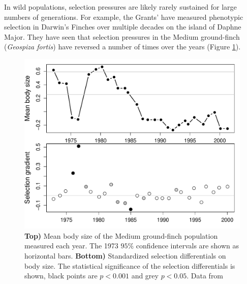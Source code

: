 In wild populations, selection pressures are likely rarely sustained 
for large numbers of generations. For example, the Grants' have
measured phenotypic selection in Darwin's Finches over multiple
decades on the island of Daphne Major. They have seen that
selection pressures in the Medium ground-finch ({\it Geospiza fortis})
have reversed a number of times over the years (Figure
\ref{fig:Darwins_Finches_unpred}). 
\begin{figure}
\begin{center}
\includegraphics[width= 0.8 \textwidth]{Journal_figs/Quant_gen/Darwins_Finches_unpred/Darwins_Finches_unpred.pdf}
\end{center}
\caption[4cm]{{\bf Top)} Mean body size of the Medium ground-finch
  population measured each year. The 1973 $95\%$ confidence intervals
  are shown as horizontal bars. {\bf Bottom)} Standardized
  selection differentials on body size. The statistical significance of
  the selection differentials is shown, black points are $p<0.001$ and grey $p<0.05$.
  Data from \citet{grant2002unpredictable} } \label{fig:Darwins_Finches_unpred}  
\end{figure}

